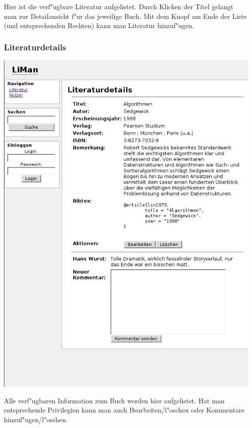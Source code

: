 Hier ist die verf"ugbare Literatur aufgelistet. Durch Klicken der Titel gelangt man zur Detailansicht f"ur 
das jeweilige Buch. Mit dem Knopf am Ende der Liste (und entsprechenden Rechten) kann man Literatur hinzuf"ugen.

\subsubsection{Literaturdetails}
\includegraphics[scale=0.6]{lit.png}

Alle verf"ugbaren Information zum Buch werden hier aufgelistet. Hat man entsprechende Privilegien kann man auch
Bearbeiten/l"oschen oder Kommentare hinzuf"ugen/l"oschen.

